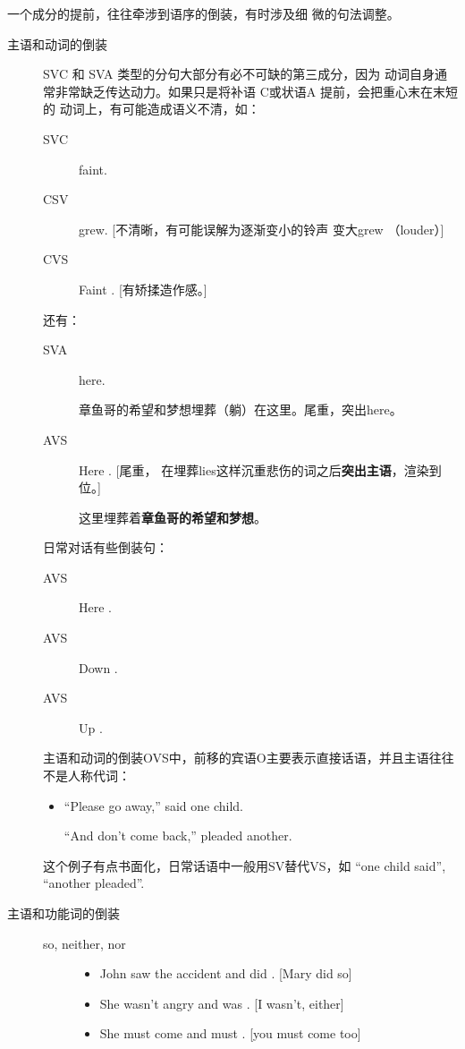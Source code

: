  一个成分的提前，往往牵涉到语序的倒装，有时涉及细
微的句法调整。
\begin{description}
\item[主语和动词的倒装] SVC 和 SVA 类型的分句大部分有必不可缺的第三成分，因为
  动词自身通常非常缺乏传达动力。如果只是将补语 C或状语A 提前，会把重心末在末短的
  动词上，有可能造成语义不清，如：
  \begin{description}
  \item[SVC]   faint.
  \item[CSV]   grew. [不清晰，有可能误解为逐渐变小的铃声
    变大grew （louder）]
  \item[CVS] Faint  . [有矫揉造作感。]
  \end{description}
  还有：
  \begin{description}
  \item[SVA]   here.

    章鱼哥的希望和梦想埋葬（躺）在这里。尾重，突出here。

  \item[AVS] Here  . [尾重，
    在埋葬lies这样沉重悲伤的词之后\textbf{突出主语}，渲染到位。]

    这里埋葬着\textbf{章鱼哥的希望和梦想}。
  \end{description}
  日常对话有些倒装句：
  \begin{description}
  \item[AVS] Here  .

  \item[AVS] Down  .
  \item[AVS] Up  .
  \end{description}

  主语和动词的倒装OVS中，前移的宾语O主要表示直接话语，并且主语往往不是人称代词：
  \begin{itemize}
  \item ``Please go away,'' said one child.

    ``And don't come back,'' pleaded another.
  \end{itemize}
  这个例子有点书面化，日常话语中一般用SV替代VS，如 ``one child said'',
  ``another pleaded''.

\item[主语和功能词的倒装]
  \begin{description}
  \item[so, neither, nor]
    \begin{itemize}
    \item John saw the accident and  did . [Mary did so]
    \item She wasn't angry and  was . [I wasn't, either]
    \item She must come and  must . [you must come too]


\end{itemize}
\end{description}
\end{description}
